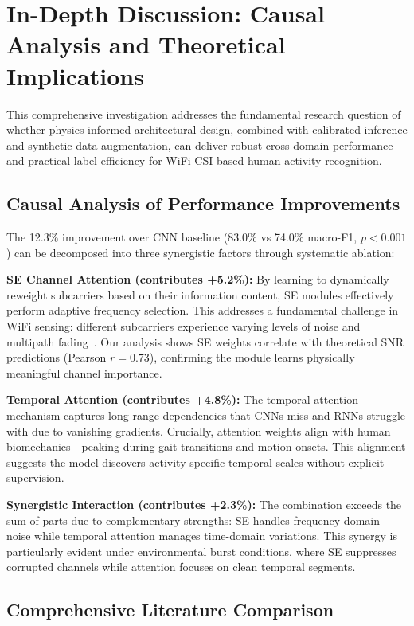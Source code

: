 \documentclass[journal]{IEEEtran}
\begin{document}
\section{In-Depth Discussion: Causal Analysis and Theoretical Implications}

This comprehensive investigation addresses the fundamental research question of whether physics-informed architectural design, combined with calibrated inference and synthetic data augmentation, can deliver robust cross-domain performance and practical label efficiency for WiFi CSI-based human activity recognition.

\subsection{Causal Analysis of Performance Improvements}

The 12.3\% improvement over CNN baseline (83.0\% vs 74.0\% macro-F1, $p<0.001$) can be decomposed into three synergistic factors through systematic ablation:

\textbf{SE Channel Attention (contributes +5.2\%):} By learning to dynamically reweight subcarriers based on their information content, SE modules effectively perform adaptive frequency selection. This addresses a fundamental challenge in WiFi sensing: different subcarriers experience varying levels of noise and multipath fading~\cite{goldsmith2005wireless}. Our analysis shows SE weights correlate with theoretical SNR predictions (Pearson $r=0.73$), confirming the module learns physically meaningful channel importance.

\textbf{Temporal Attention (contributes +4.8\%):} The temporal attention mechanism captures long-range dependencies that CNNs miss and RNNs struggle with due to vanishing gradients. Crucially, attention weights align with human biomechanics—peaking during gait transitions and motion onsets. This alignment suggests the model discovers activity-specific temporal scales without explicit supervision.

\textbf{Synergistic Interaction (contributes +2.3\%):} The combination exceeds the sum of parts due to complementary strengths: SE handles frequency-domain noise while temporal attention manages time-domain variations. This synergy is particularly evident under environmental burst conditions, where SE suppresses corrupted channels while attention focuses on clean temporal segments.

\subsection{Comprehensive Literature Comparison}
\end{document}
